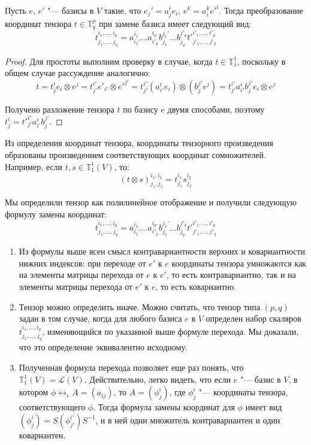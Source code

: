 \begin{theorem}
	Пусть $e$, $e'$ "--- базисы в $V$ такие, что $e_j' = a_j^ie_i$, $e^k = a^k_ie'^i$. Тогда преобразование координат тензора $t \in \mathbb T^p_q$ при замене базиса имеет следующий вид:
	\[t^{i_1, \dots, i_p}_{j_1, \dots, j_q} = a^{i_1}_{i_1'}\dots a^{i_p}_{i'_p}b^{j_1'}_{j_1}\dots b^{j'_q}_{j_q}t'^{i'_1, \dots, i'_p}_{j'_1, \dots, j'_q}\]
\end{theorem}

\begin{proof}
	Для простоты выполним проверку в случае, когда $t \in \mathbb{T}^1_1$, поскольку в общем случае рассуждение аналогично:
	\[t = t^i_je_i \otimes e^j = t^{i'}_{j'}e'_{i'} \otimes e'^{j'} = t^{i'}_{j'}(a_{i'}^ie_i) \otimes (b^{j'}_je^{j}) = t^{i'}_{j'}a^i_{i'}b^{j'}_j e_i \otimes e^j\]
	
	Получено разложение тензора $t$ по базису $e$ двумя способами, поэтому $t^i_j = t'^{i'}_{j'}a^i_{i'}b^{j'}_j$.
\end{proof}

\begin{note}
	Из определения координат тензора, координаты тензорного произведения образованы произведением соответствующих координат сомножителей. Например, если $t, s \in \mathbb{T}^1_1(V)$, то:
	\[(t \otimes s)_{j_1, j_2}^{i_1, i_2} = t^{i_1}_{j_1}s^{i_2}_{j_2}\]
\end{note}

\begin{note}
	Мы определили тензор как полилинейное отображение и получили следующую формулу замены координат:
	\[t^{i_1, \dots, i_p}_{j_1, \dots, j_q} = a^{i_1}_{i_1'}\dots a^{i_p}_{i'_p}b^{j_1'}_{j_1}\dots b^{j'_q}_{j_q}t'^{i'_1, \dots, i'_p}_{j'_1, \dots, j'_q}\]
	
	\begin{enumerate}
		\item Из формулы выше ясен смысл контравариантности верхних и ковариантности нижних индексов: при переходе от $e'$ к $e$ координаты тензора умножаются как на элементы матрицы перехода от $e$ к $e'$, то есть контравариантно, так и на элементы матрицы перехода от $e'$ к $e$, то есть ковариантно.
		
		\item Тензор можно определить иначе. Можно считать, что тензор типа $(p, q)$ задан в том случае, когда для любого базиса $e$ в $V$ определен набор скаляров $t^{i_1, \dots, i_p}_{j_1, \dots, j_q}$, изменяющийся по указанной выше формуле перехода. Мы доказали, что это определение эквивалентно исходному.
		
		\item Полученная формула перехода позволяет еще раз понять, что $\mathbb{T}^1_1(V) = \mathcal{L}(V)$. Действительно, легко видеть, что если $e$ "--- базис в $V$, в котором $\phi \leftrightarrow_e A = (a_{ij})$, то $A = (\phi^i_j)$, где $\phi^i_j$ "--- координаты тензора, соответствующего $\phi$. Тогда формула замены координат для $\phi$ имеет вид $(\phi^i_j) = S(\phi^{i'}_{j'})S^{-1}$, и в ней один множитель контравариантен и один ковариантен.
	\end{enumerate}
\end{note}